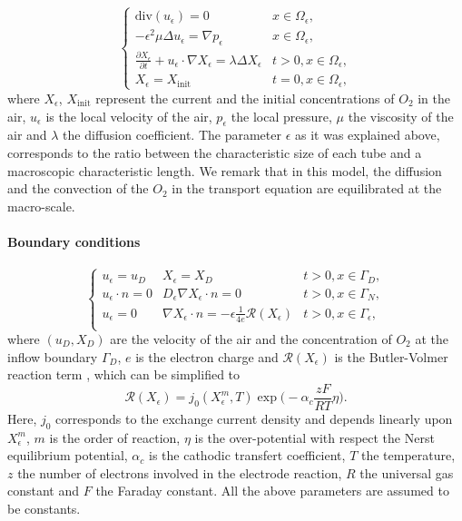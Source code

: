 \documentclass{article}
\newcommand{\ue}{u_\epsilon}
\newcommand{\pe}{p_\epsilon}
\begin{document}
\begin{equation}
\label{equation_eps}
\left\{
\begin{array}{ll}
\text{div}(\ue)=0  &  x\in \Omega_\epsilon,\\
-\epsilon^2 \mu \Delta \ue = \nabla \pe & x\in \Omega_\epsilon,\\
\frac{\partial X_\epsilon}{\partial t}+ \ue\cdot \nabla X_\epsilon=\lambda \Delta X_\epsilon 
 & t>0, x\in \Omega_\epsilon,\\
 X_\epsilon =X_{\text{init}} & t=0, x\in \Omega_\epsilon,
\end{array}
\right.
\end{equation}
where $X_\epsilon$, $X_{\text{init}}$ represent the current and the initial concentrations of $O_2$ in the air, $u_\epsilon$ is the local velocity of the air, $p_\epsilon$ the local pressure, $\mu$ the viscosity of the air and
$\lambda$ the diffusion coefficient. The parameter $\epsilon$ as it was explained above, corresponds to the ratio between the characteristic size of each tube and a macroscopic characteristic length. We remark that in this model, the diffusion and the convection of the $O_2$ in the  transport equation are equilibrated at the macro-scale.\\




\paragraph{Boundary conditions}


\begin{equation}
\label{boundary_conditions_eps}
\left\{
\begin{array}{lll}
\ue=u_D & X_\epsilon=X_D & t>0,x\in \Gamma_D,\\
\ue\cdot n=0 & D_\epsilon \nabla X_\epsilon \cdot n=0 & t>0, x\in \Gamma_N,\\
\ue=0 &  \nabla X_\epsilon \cdot n=-\epsilon \frac{1}{4e}\mathcal{R}(X_\epsilon) & t>0, x\in \Gamma_\epsilon,\\
\end{array}
\right.
\end{equation}
where $(u_D,X_D)$ are the velocity of the air and the concentration of $O_2$ at the inflow boundary $\Gamma_D$,
$e$ is the electron charge and $\mathcal{R}(X_\epsilon)$ is the Butler-Volmer reaction term \cite{Kee2012331}, which can be simplified  \cite{schmuck2013homogenization,bove2008modeling} to
\begin{equation*}
\mathcal{R}(X_\epsilon)=j_0 (X^m_\epsilon,T) \exp\Big(-\alpha_c \frac{zF}{RT}\eta\Big).
\end{equation*}
{Here,} $j_0$ corresponds to the exchange current density and depends linearly upon $X_{\epsilon}^m$, $m$ is the order of reaction,  $\eta$ is the over-potential with respect the Nerst equilibrium potential, $\alpha_c$ is the cathodic transfert coefficient, $T$ the temperature, $z$ the number of electrons involved in the electrode reaction, $R$ the universal gas constant and $F$ the Faraday constant. All the above parameters are assumed to be constants.
\end{document}
